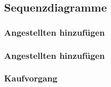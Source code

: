 \subsection{Sequenzdiagramme}
\begin{frame}
\frametitle{Angestellten hinzuf\"ugen}
\end{frame}

\begin{frame}
\frametitle{Angestellten hinzuf\"ugen}
\end{frame}

\begin{frame}
\frametitle{Kaufvorgang}
\end{frame}

